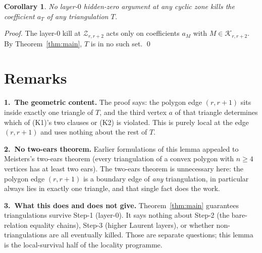 \documentclass[11pt]{article}
\newtheorem{cor}[thm]{Corollary}
\theoremstyle{definition}
\begin{document}
\begin{cor}\label{cor:loc}
No layer-$0$ hidden-zero argument at any cyclic zone kills the
coefficient $a_T$ of any triangulation $T$.
\end{cor}

\begin{proof}
The layer-$0$ kill at $\mathcal Z_{r,r+2}$ acts only on coefficients
$a_M$ with $M\in\mathcal K_{r,r+2}$. By Theorem~\ref{thm:main}, $T$ is
in no such set. \qed
\end{proof}

\section*{Remarks}

\textbf{1.\ The geometric content.} The proof says: the polygon edge
$(r,r{+}1)$ sits inside exactly one triangle of $T$, and the third
vertex $a$ of that triangle determines which of (K1)'s two clauses or
(K2) is violated. This is purely local at the edge $(r,r{+}1)$ and uses
nothing about the rest of $T$.

\smallskip\noindent
\textbf{2.\ No two-ears theorem.} Earlier formulations of this lemma
appealed to Meisters's two-ears theorem (every triangulation of a
convex polygon with $n\ge 4$ vertices has at least two ears). The
two-ears theorem is unnecessary here: the polygon edge $(r,r{+}1)$ is a
boundary edge of \emph{any} triangulation, in particular always lies in
exactly one triangle, and that single fact does the work.

\smallskip\noindent
\textbf{3.\ What this does and does not give.} Theorem~\ref{thm:main}
guarantees triangulations survive Step-1 (layer-$0$). It says nothing
about Step-2 (the bare-relation equality chains), Step-3 (higher
Laurent layers), or whether non-triangulations are all eventually
killed. Those are separate questions; this lemma is the local-survival
half of the locality programme.
\end{document}

